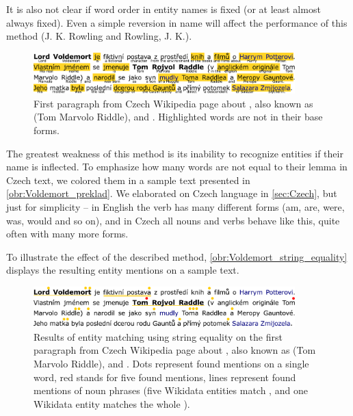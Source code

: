 It is also not clear if word order in entity names is fixed (or at least almost always fixed). Even a simple reversion in name will affect the performance of this method (J. K. Rowling and Rowling, J. K.).

\begin{figure}
\centering
\includegraphics[width = 0.9\textwidth]{./img/Voldemort_infinitivy_preklad}

\caption{First paragraph from Czech Wikipedia page about , also known as  (Tom Marvolo Riddle),  and . Highlighted words are not in their base forms. }
\label{obr:Voldemort_preklad}

\end{figure}

The greatest weakness of this method is its inability to recognize entities if their name is inflected. To emphasize how many words are not equal to their lemma in Czech text, we colored them in a sample text presented in \autoref{obr:Voldemort_preklad}. We elaborated on Czech language in \autoref{sec:Czech}, but just for simplicity -- in English the verb  has many different forms (am, are, were, was, would and so on), and in Czech all nouns and verbs behave like this, quite often with many more forms. 

To illustrate the effect of the described method, \autoref{obr:Voldemort_string_equality} displays the resulting entity mentions on a sample text.


\begin{figure}[h]

\centering
\includegraphics[width = 0.9\textwidth]{./img/Voldemort_string_equality}

\caption{Results of entity matching using string equality on the first paragraph from Czech Wikipedia page about  , also known as  (Tom Marvolo Riddle),  and . Dots represent found mentions on a single word, red stands for five found mentions, lines represent found mentions of noun phrases (five Wikidata entities match , and one Wikidata entity matches the whole ).}
\label{obr:Voldemort_string_equality}

\end{figure}

